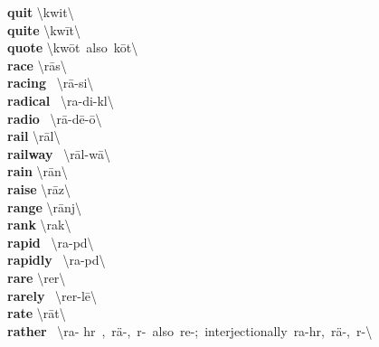 \documentclass[10pt,a4paper]{article}
\begin{document}
\begin{multicols}{2}
\textbf{ quit }\quad \textbackslash \textprimstress kwit\textbackslash \\
\textbf{ quite }\quad \textbackslash \textprimstress kw\={i}t\textbackslash \\
\textbf{ quote }\quad \textbackslash \textprimstress kw\={o}t\ also\ \textprimstress k\={o}t\textbackslash \\
\textbf{ race }\quad \textbackslash \textprimstress r\={a}s\textbackslash \\
\textbf{ racing }\quad \ \textbackslash \textprimstress r\={a}-si\engma \textbackslash \\
\textbf{ radical }\quad \ \textbackslash \textprimstress ra-di-k\textschwa l\textbackslash \\
\textbf{ radio }\quad \ \textbackslash \textprimstress r\={a}-d\={e}-\textsecstress \={o}\textbackslash \\
\textbf{ rail }\quad \textbackslash \textprimstress r\={a}l\textbackslash \\
\textbf{ railway }\quad \ \textbackslash \textprimstress r\={a}l-\textsecstress w\={a}\textbackslash \\
\textbf{ rain }\quad \textbackslash \textprimstress r\={a}n\textbackslash \\
\textbf{ raise }\quad \textbackslash \textprimstress r\={a}z\textbackslash \\
\textbf{ range }\quad \textbackslash \textprimstress r\={a}nj\textbackslash \\
\textbf{ rank }\quad \textbackslash \textprimstress ra\engma k\textbackslash \\
\textbf{ rapid }\quad \ \textbackslash \textprimstress ra-p\textschwa d\textbackslash \\
\textbf{ rapidly }\quad \ \textbackslash \textprimstress ra-p\textschwa d\textbackslash \\
\textbf{ rare }\quad \textbackslash \textprimstress rer\textbackslash \\
\textbf{ rarely }\quad \ \textbackslash \textprimstress rer-l\={e}\textbackslash \\
\textbf{ rate }\quad \textbackslash \textprimstress r\={a}t\textbackslash \\
\textbf{ rather }\quad \ \textbackslash \textprimstress ra- h\textschwa r\ ,\ \textprimstress r\"{a}-,\ \textprimstress r\textschwa -\ also\ \textprimstress re-;\ interjectionally\ \textprimstress ra-\textprimstress  h\textschwa r,\ \textprimstress r\"{a}-,\ \textprimstress r\textschwa -\textbackslash \\

\end{multicols}
\end{document}
